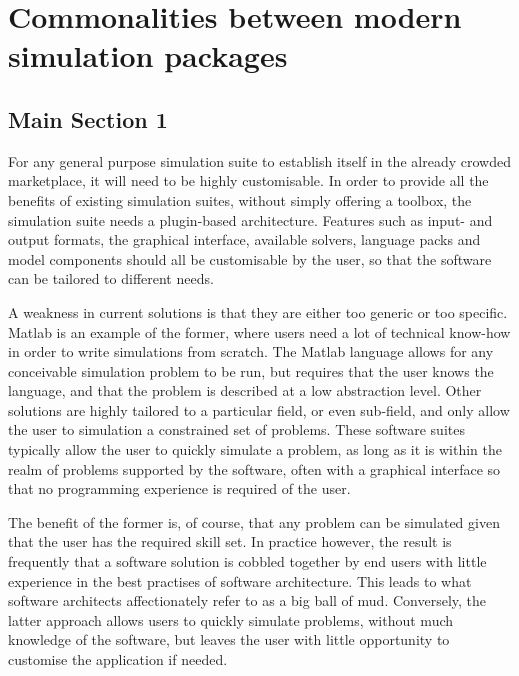 \documentclass[../main.tex]{subfiles}
\begin{document}
\chapter{Commonalities between modern simulation packages} %

\label{Chapter02} %


\section{Main Section 1}

For any general purpose simulation suite to establish itself in the already
crowded marketplace, it will need to be highly customisable. In order to
provide all the benefits of existing simulation suites, without simply offering
a toolbox, the simulation suite needs a plugin-based architecture. Features
such as input- and output formats, the graphical interface, available solvers,
language packs and model components should all be customisable by the user, so
that the software can be tailored to different needs.

A weakness in current solutions is that they are either too generic or too
specific. Matlab is an example of the former, where users need a lot of
technical know-how in order to write simulations from scratch. The Matlab
language allows for any conceivable simulation problem to be run, but requires
that the user knows the language, and that the problem is described at a low
abstraction level. Other solutions are highly tailored to a particular field,
or even sub-field, and only allow the user to simulation a constrained set of
problems. These software suites typically allow the user to quickly simulate a
problem, as long as it is within the realm of problems supported by the
software, often with a graphical interface so that no programming experience is
required of the user.

The benefit of the former is, of course, that any problem can be simulated
given that the user has the required skill set. In practice however, the result
is frequently that a software solution is cobbled together by end users with
little experience in the best practises of software architecture. This leads to
what software architects affectionately refer to as a big ball of mud.
Conversely, the latter approach allows users to quickly simulate problems,
without much knowledge of the software, but leaves the user with little
opportunity to customise the application if needed.
\end{document}
